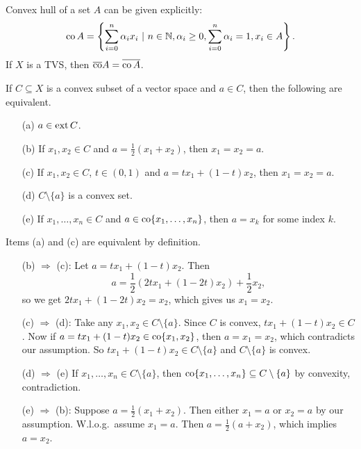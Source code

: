 Convex hull of a set $A$ can be given explicitly:
$$\operatorname{co} A = \left\lbrace \sum_{i = 0}^n \alpha_i x_i\ |\ n \in \mathbb {N}, \alpha_i \geq 0, \sum_{i = 0} ^n \alpha_i = 1, x_i \in A\right\rbrace.$$
If $X$ is a TVS, then $\overline{\operatorname{co}} A = \overline{\operatorname{co} A}$.

\begin{lemma}
  If $C \subseteq X$ is a convex subset of a vector space and $a \in C$, then the following are equivalent.
  \begin{itemize}
    \item[(a)] $a \in \operatorname{ext} C$.
    \item[(b)] If $x_1, x_2 \in C$ and $a = \frac{1}{2} (x_1 + x_2)$, then $x_1 = x_2 = a$.
    \item[(c)] If $x_1, x_2 \in C$, $t \in (0, 1)$ and $a = t x_1 + (1 - t) x_2$, then $x_1 = x_2 = a$.
    \item[(d)] $C \setminus \{a\}$ is a convex set.  
    \item[(e)] If $x_1, \dots, x_n \in C$ and $a \in \operatorname{co} \{x_1, \dots, x_n\}$, then $a = x_k$ for some index $k$.
  \end{itemize}
\end{lemma}

\begin{myproof}
  Items (a) and (c) are equivalent by definition.
  \begin{enumerate}[itemindent=36pt]
    \item[(b) $\Rightarrow$ (c):] Let $a = tx_1 + (1 - t) x_2$. Then $$a = \frac{1}{2} (2t x_1 + (1 - 2t) x_2) + \frac{1}{2} x_2,$$
    so we get $2t x_1 + (1 - 2t) x_2 = x_2$, which gives us $x_1 = x_2$.
    \item[(c) $\Rightarrow$ (d):] Take any $x_1, x_2 \in C \setminus \{a\}$. Since $C$ is convex, $t x_1 + (1 - t) x_2 \in C$.
    Now if $a = t x_1 + (1 - t) x_2 \in \operatorname{co} \{x_1, x_2\}$, then $a = x_1 = x_2$, which contradicts our assumption. So $t x_1 + (1 - t) x_2 \in C \setminus \{a\}$
    and $C \setminus \{a\}$ is convex.
    \item[(d) $\Rightarrow$ (e)] If $x_1, \dots, x_n \in C \setminus \{a\}$, then $\operatorname{co} \{x_1, \dots, x_n\} \subseteq C \setminus \{a\}$ by convexity, contradiction. 
    \item[(e) $\Rightarrow$ (b):] Suppose $a = \frac{1}{2} (x_1 + x_2)$. Then either $x_1 = a$ or $x_2 = a$ by our assumption. W.l.o.g.~assume $x_1 = a$.
    Then $a = \frac{1}{2} (a + x_2)$, which implies $a = x_2$. \qedhere
  \end{enumerate}
\end{myproof}

